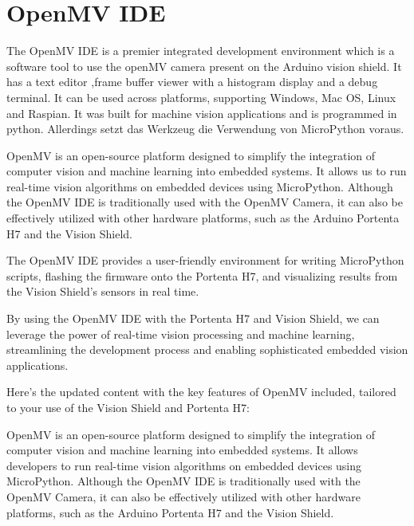 %
%




\chapter{OpenMV IDE}




The OpenMV IDE is a premier integrated development environment which is a software tool  to use the openMV camera present on the Arduino vision shield.  It has a text editor ,frame buffer viewer with a histogram display and a debug terminal. It can be used across platforms, supporting Windows, Mac OS, Linux and Raspian. It was built for machine vision applications and is programmed in python\cite{OpenMV:2021}. Allerdings setzt das Werkzeug die Verwendung von MicroPython voraus. 


OpenMV is an open-source platform designed to simplify the integration of computer vision and machine learning into embedded systems. It allows us to run real-time vision algorithms on embedded devices using MicroPython. Although the OpenMV IDE is traditionally used with the OpenMV Camera, it can also be effectively utilized with other hardware platforms, such as the Arduino Portenta H7 and the Vision Shield.

The OpenMV IDE provides a user-friendly environment for writing MicroPython scripts, flashing the firmware onto the Portenta H7, and visualizing results from the Vision Shield's sensors in real time.

By using the OpenMV IDE with the Portenta H7 and Vision Shield, we can leverage the power of real-time vision processing and machine learning, streamlining the development process and enabling sophisticated embedded vision applications. \cite{openmv_docs:2024}


Here's the updated content with the key features of OpenMV included, tailored to your use of the Vision Shield and Portenta H7:

OpenMV is an open-source platform designed to simplify the integration of computer vision and machine learning into embedded systems. It allows developers to run real-time vision algorithms on embedded devices using MicroPython. Although the OpenMV IDE is traditionally used with the OpenMV Camera, it can also be effectively utilized with other hardware platforms, such as the Arduino Portenta H7 and the Vision Shield.

